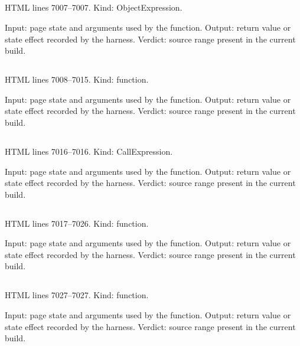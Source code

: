 \subsection*{\texttt{}}
\label{vf_342_APP_STATE}
HTML lines 7007--7007. Kind: ObjectExpression.

Input: page state and arguments used by the function.
Output: return value or state effect recorded by the harness.
Verdict: source range present in the current build.

\subsection*{\texttt{}}
\label{vf_343_appError}
HTML lines 7008--7015. Kind: function.

Input: page state and arguments used by the function.
Output: return value or state effect recorded by the harness.
Verdict: source range present in the current build.

\subsection*{\texttt{}}
\label{vf_344_APP_PHASE_TRANSITIONS}
HTML lines 7016--7016. Kind: CallExpression.

Input: page state and arguments used by the function.
Output: return value or state effect recorded by the harness.
Verdict: source range present in the current build.

\subsection*{\texttt{}}
\label{vf_345_setPhase}
HTML lines 7017--7026. Kind: function.

Input: page state and arguments used by the function.
Output: return value or state effect recorded by the harness.
Verdict: source range present in the current build.

\subsection*{\texttt{}}
\label{vf_346_appDiagnostics}
HTML lines 7027--7027. Kind: function.

Input: page state and arguments used by the function.
Output: return value or state effect recorded by the harness.
Verdict: source range present in the current build.

